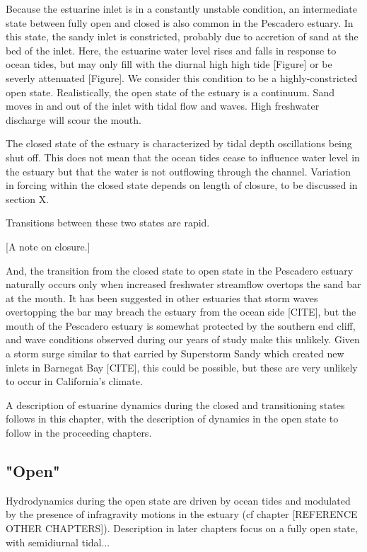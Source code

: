 Because the estuarine inlet is in a constantly unstable condition, an
intermediate state between fully open and closed is also common in the
Pescadero estuary.  In this state, the sandy inlet is constricted,
probably due to accretion of sand at the bed of the inlet. Here, the
estuarine water level rises and falls in response to ocean tides, but
may only fill with the diurnal high high tide [Figure] or be severly
attenuated [Figure]. We consider this condition to be a
highly-constricted open state. Realistically, the open state of the
estuary is a continuum. Sand moves in and out of the inlet with tidal
flow and waves. High freshwater discharge will scour the mouth.

The closed state of the estuary is characterized by tidal depth
oscillations being shut off. This does not mean that the ocean tides
cease to influence water level in the estuary but that the water is not
outflowing through the channel. Variation in forcing within the closed
state depends on length of closure, to be discussed in section {X}.

Transitions between these two states are rapid.

[A note on closure.]

And, the transition from the closed state to open state in the Pescadero
estuary naturally occurs only when increased freshwater streamflow
overtops the sand bar at the mouth. It has been suggested in other
estuaries that storm waves overtopping the bar may breach the estuary
from the ocean side [CITE], but the mouth of the Pescadero estuary is
somewhat protected by the southern end cliff, and wave conditions
observed during our years of study make this unlikely. Given a storm
surge similar to that carried by Superstorm Sandy which created new
inlets in Barnegat Bay [CITE], this could be possible, but these are
very unlikely to occur in California's climate.

A description of estuarine dynamics during the closed and transitioning
states follows in this chapter, with the description of dynamics in the
open state to follow in the proceeding chapters.

\subsection{"Open"} \label{opench2}
Hydrodynamics during the open state are driven by ocean tides and modulated by the presence of infragravity motions in the 
estuary (cf chapter [REFERENCE OTHER CHAPTERS]). Description in later chapters focus on a fully open state, with 
semidiurnal tidal...


